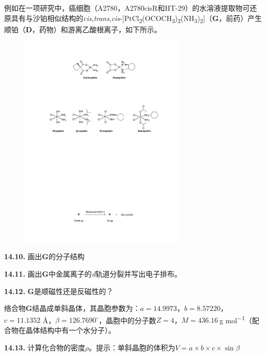 例如在一项研究中，癌细胞（A2780，A2780cisR和HT-29）的水溶液提取物可还原具有与沙铂相似结构的\textit{cis},\textit{trans},\textit{cis}-[PtCl\textsubscript{2}(OCOCH\textsubscript{3})\textsubscript{2}(NH\textsubscript{3})\textsubscript{2}]（\textbf{G}，前药）产生顺铂（\textbf{D}，药物）和游离乙酸根离子，如下所示。

\begin{figure}[h]
	\centering
	\includegraphics[width=8cm]{./pic/t14-6.pdf}
\end{figure}

\noindent\textbf{14.10.} 画出\textbf{G}的分子结构

\noindent\textbf{14.11.} 画出\textbf{G}中金属离子的\textit{d}轨道分裂并写出电子排布。

\noindent\textbf{14.12.} \textbf{G}是顺磁性还是反磁性的？

络合物\textbf{G}结晶成单斜晶体，其晶胞参数为：$a=14.9973$，$b=8.57220$，$c=11.1352$ \AA，$\beta=126.7690^{\circ} $，晶胞中的分子数$Z=4$，$M=436.16\ $g mol\textsuperscript{−1}（配合物在晶体结构中有一个水分子）。

\noindent\textbf{14.13.} 计算化合物的密度$\rho$。提示：单斜晶胞的体积为$V=a\times b\times c\times \sin\beta$

